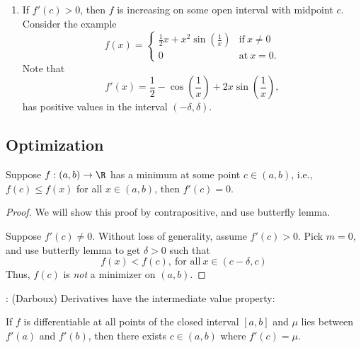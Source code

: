 \begin{enumerate}
	\item If \(f'(c)>0\), then \(f\) is increasing on some open interval with midpoint \(c\). Consider the example
	\begin{equation*}
		f(x)=\begin{cases}
				\frac{1}{2}x+x^2\sin{\left(\frac{1}{x}\right)}&\text{if}~x\neq 0\\
				0&\text{at}~x=0.			
			 \end{cases}
	\end{equation*}
	Note that 
	\begin{equation*}
		f'(x)=\frac{1}{2}-\cos{\left(\frac{1}{x}\right)}+2x\sin{\left(\frac{1}{x}\right)},
	\end{equation*}
	has positive values in the interval \((-\delta,\delta)\).
\end{enumerate}

\subsection{Optimization}

\begin{ntheorem}{}
	Suppose \(f:(a,b)\to\R\) has a minimum at some point \(c\in(a,b)\), i.e., \(f(c)\leq f(x)\) for all \(x\in(a,b)\), then \(f'(c)=0\).
\end{ntheorem}

\begin{proof}
	We will show this proof by contrapositive, and use butterfly lemma.
	
	\medskip
	
	Suppose \(f'(c)\neq 0\). Without loss of generality, assume \(f'(c)>0\). Pick \(m=0\), and use butterfly lemma to get \(\delta>0\) such that 
	\begin{equation*}
		f(x)<f(c),~\text{for all}~x\in (c-\delta,c)
	\end{equation*} 
	Thus, \(f(c)\) is \emph{not} a minimizer on \((a,b)\).
\end{proof}

\begin{ntheorem}{: (Darboux)}
	Derivatives have the intermediate value property:
	
	\medskip
	
	If \(f\) is differentiable at all points of the closed interval \([a,b]\) and \(\mu\) lies between \(f'(a)\) and \(f'(b)\), then there exists \(c\in (a,b)\) where \(f'(c)=\mu\).
\end{ntheorem}

